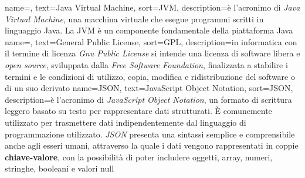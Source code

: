  {
    name=,
    text=Java Virtual Machine,
    sort=JVM,
    description={è l'acronimo di \textit{Java Virtual Machine},
     una macchina virtuale che esegue programmi scritti in linguaggio Java. La JVM è un componente fondamentale della piattaforma Java}
}
     {
        name=,
        text=General Public License,
        sort=GPL,
        description={in informatica con il termine di licenza \textit{Gnu Public License} si intende  
        una licenza di software libera e \textit{open source}, sviluppata dalla \textit{Free Software Foundation}, finalizzata a stabilire i termini e le condizioni 
        di utilizzo, copia, modifica e ridistribuzione del software o di un suo derivato}
    }
    {
        name={JSON},
        text=JavaScript Object Notation,
        sort=JSON,
        description={è l'acronimo di \textit{JavaScript Object Notation}, un formato di scrittura leggero basato su testo per rappresentare dati strutturati. 
        È comunemente utilizzato per trasmettere dati indipendentemente dal linguaggio di programmazione utilizzato. \textit{JSON} presenta una sintassi semplice e comprensibile anche agli 
        esseri umani, attraverso la quale i dati vengono rappresentati in coppie \textbf{chiave-valore}, con la possibilità di poter includere 
        oggetti, array, numeri, stringhe, booleani e valori null}
    }
